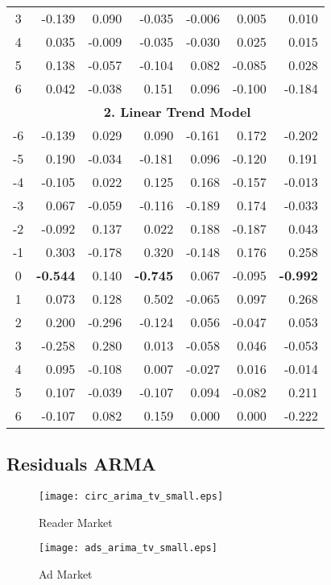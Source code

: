 \documentclass[10pt,a4paper]{scrreprt}
\begin{document}
\begin{table}[htbp]
\begin{tabular}{c|rrr|rrr|}
    3     & -0.139 & 0.090 & -0.035 & -0.006 & 0.005 & 0.010 \\
    4     & 0.035 & -0.009 & -0.035 & -0.030 & 0.025 & 0.015 \\
    5     & 0.138 & -0.057 & -0.104 & 0.082 & -0.085 & 0.028 \\
    6     & 0.042 & -0.038 & 0.151 & 0.096 & -0.100 & -0.184 \\
\multicolumn{1}{r}{} & \multicolumn{6}{c}{\textbf{2. Linear Trend Model}} \\
    -6    & -0.139 & 0.029 & 0.090 & -0.161 & 0.172 & -0.202 \\
    -5    & 0.190 & -0.034 & -0.181 & 0.096 & -0.120 & 0.191 \\
    -4    & -0.105 & 0.022 & 0.125 & 0.168 & -0.157 & -0.013 \\
    -3    & 0.067 & -0.059 & -0.116 & -0.189 & 0.174 & -0.033 \\
    -2    & -0.092 & 0.137 & 0.022 & 0.188 & -0.187 & 0.043 \\
    -1    & 0.303 & -0.178 & 0.320 & -0.148 & 0.176 & 0.258 \\
    0     & \textbf{-0.544} & 0.140 & \textbf{-0.745} & 0.067 & -0.095 & \textbf{-0.992} \\
    1     & 0.073 & 0.128 & 0.502 & -0.065 & 0.097 & 0.268 \\
    2     & 0.200 & -0.296 & -0.124 & 0.056 & -0.047 & 0.053 \\
    3     & -0.258 & 0.280 & 0.013 & -0.058 & 0.046 & -0.053 \\
    4     & 0.095 & -0.108 & 0.007 & -0.027 & 0.016 & -0.014 \\
    5     & 0.107 & -0.039 & -0.107 & 0.094 & -0.082 & 0.211 \\
    6     & -0.107 & 0.082 & 0.159 & 0.000 & 0.000 & -0.222 \\
 \end{tabular}%
  \label{tab:addlabel}%
\end{table}%

\subsection{Residuals ARMA}
\begin{figure}[H]
\begin{minipage}[hbt]{7cm}
	\centering
	\texttt{[image: circ\_arima\_tv\_small.eps]}
	\caption{Reader Market}
	\label{tvcirc}
\end{minipage}
\hfill
\begin{minipage}[hbt]{7cm}
	\centering
	\texttt{[image: ads\_arima\_tv\_small.eps]}
	\caption{Ad Market}
	\label{tvadsite}
\end{minipage}
\end{figure}
\end{document}
